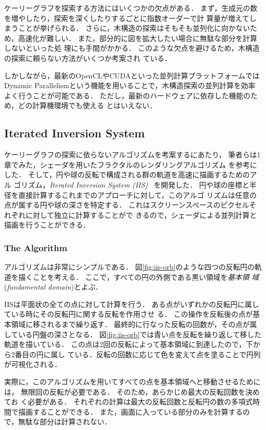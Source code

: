 ケーリーグラフを探索する方法にはいくつかの欠点がある．
まず，生成元の数を増やしたり，探索を深くしたりするごとに指数オーダーで計
算量が増えてしまうことが挙げられる．
さらに，木構造の探索はそもそも並列化に向かないため，高速化が難しい．
また，部分的に図を拡大したい場合に無駄な部分を計算しないといった処
理にも手間がかかる．
このような欠点を避けるため，木構造の探索に頼らない方法がいくつか考案され
ている．

しかしながら，最新のOpenCLやCUDAといった並列計算プラットフォームでは
Dynamic Parallelismという機能を用いることで，木構造探索の並列計算を効率
よく行うことが可能である．
ただし，最新のハードウェアに依存した機能のため，どの計算機環境でも使える
とはいえない．

\subsection{Iterated Inversion System}

ケーリーグラフの探索に依らないアルゴリズムを考案するにあたり，
筆者らは1章でみた，シェーダを用いたフラクタルのレンダリングアルゴリズム
を参考にした．
そして，円や球の反転で構成される群の軌道を高速に描画するためのアル
ゴリズム，\textit{Iterated Inversion System (IIS)}~\cite{bridges2016-367}
を開発した．
円や球の座標と半径を直接計算するこれまでのアプローチに対して，このアルゴ
リズムは任意の点が属する円や球の深さを特定する．
これはスクリーンスペースのピクセルそれぞれに対して独立に計算することがで
きるので，シェーダによる並列計算と描画を行うことができる．

\subsubsection{The Algorithm}

アルゴリズムは非常にシンプルである．
図\ref{fig:iis-orb}のような四つの反転円の軌道を描くことを考える．
ここで，すべての円の外側である黒い領域を\emph{基本領
域}(\textit{fundamental domain})とよぶ．

IISは平面状の全ての点に対して計算を行う．
ある点がいずれかの反転円に属している時にその反転円に関する反転を作用させ
る．
この操作を反転後の点が基本領域に移されるまで繰り返す．
最終的に行なった反転の回数が，その点が属している円盤の深さとなる．
図\ref{fig:iis-orb}では青い点を反転を繰り返して移した軌道を描いている．
この点は2回の反転によって基本領域に到達したので，下から2番目の円に属し
ている．反転の回数に応じて色を変えて点を塗ることで円列が可視化される．

実際に，このアルゴリズムを用いてすべての点を基本領域へと移動させるためには，
無限回の反転が必要である． そのため，あらかじめ最大の反転回数を決めてお
く必要がある．
それぞれの計算は最大の反転回数と反転円の数の多項式時間で描画することができる．
また，画面に入っている部分のみを計算するので，無駄な部分は計算されない．

